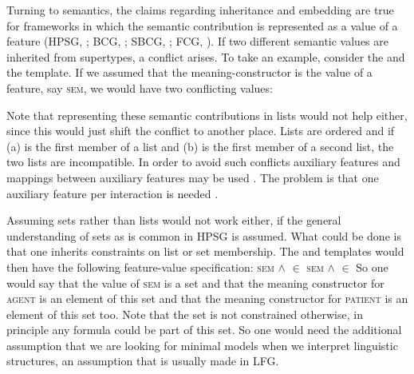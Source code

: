 Turning to semantics, the claims regarding inheritance and embedding are true for frameworks in which
the semantic contribution is represented as a value of a feature (HPSG, \citealt{ps2,Sag97a}; BCG,
\citealt{KF99a}; SBCG, \citealt{Sag2012a}; FCG, \citealt{SteelsFluid-ed}). If two different semantic values are inherited from
supertypes, a conflict arises. To take an example, consider the  and the
 template. If we assumed that the meaning-constructor is the value of a feature,
say \textsc{sem}, we would have two conflicting values:
\eal
\ex {}
\ex {}
\zl


Note that representing these semantic contributions in lists would not help either, since this would
just shift the conflict to another place. Lists are ordered and if (a) is the first member of
a list and (b) is the first member of a second list, the two lists are incompatible. 
In order to avoid such conflicts auxiliary features and mappings
between auxiliary features may be used \citep{Koenig99a}. The problem is that one auxiliary feature
per interaction is needed \citep[Section~7.5.2.2]{MuellerLehrbuch1}.

Assuming sets rather than lists would not work either, if the general understanding of sets as is
common in HPSG \citep{PM90a} is assumed. What could be done is that one inherits constraints on list
or set membership. The \templaten{Agent} and \templaten{Patient} templates would then have the
following feature-value specification:
\eal
\ex \textsc{sem} \ibox{1} $\wedge$  $\in$ 
\ex \textsc{sem}  $\wedge$  $\in$ 
\zl
So one would say that the value of \textsc{sem} is a set  and that the meaning constructor for \textsc{agent}
is an element of this set and that the meaning constructor for \textsc{patient} is an element of this set
too. Note that the set is not constrained otherwise, in principle any formula could be part of
this set. So one would need the additional assumption that we are looking for minimal models when we
interpret linguistic structures, an assumption that is usually made in LFG.


